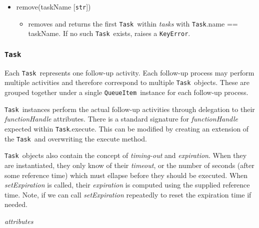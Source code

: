 \documentclass{article}
\newcommand{\QueueItem}{\texttt{QueueItem}}
\newcommand{\Task}{\texttt{Task}}
\newcommand{\pythonstr}{\texttt{str}}
\begin{document}
\begin{itemize}
{\begin{itemize}
            \item{adds a new \Task~to the \QueueItem~and updates attributes accordingly. \textit{newTasks} do not need to be ordered. Each item must be a subclas of \Task.}
        \end{itemize}
         }
    \item{remove(taskName [\pythonstr])
        \begin{itemize}
            \item{removes and returns the first \Task~within \textit{tasks} with \Task.name == taskName. If no such \Task~exists, raises a \texttt{KeyError}.}
        \end{itemize}
         }
\end{itemize}


\subsubsection{\Task}
\label{sec: Task}

Each \Task~represents one follow-up activity.
Each follow-up process may perform multiple activities and therefore correspond to multiple \Task~objects.
These are grouped together under a single \QueueItem~instance for each follow-up process.

\Task~instances perform the actual follow-up activities through delegation to their \textit{functionHandle} attributes.
There is a standard signature for \textit{functionHandle} expected within \Task.execute.
This can be modified by creating an extension of the \Task~and overwriting the execute method.

\Task~objects also contain the concept of \textit{timing-out} and \textit{expiration}.
When they are instantiated, they only know of their \textit{timeout}, or the number of seconds (after some reference time) which must ellapse before they should be executed.
When \textit{setExpiration} is called, their \textit{expiration} is computed using the supplied reference time.
Note, if we can call \textit{setExpiration} repeatedly to reset the expiration time if needed.

\vspace{0.5cm}
\noindent
\textit{attributes}
\end{document}
